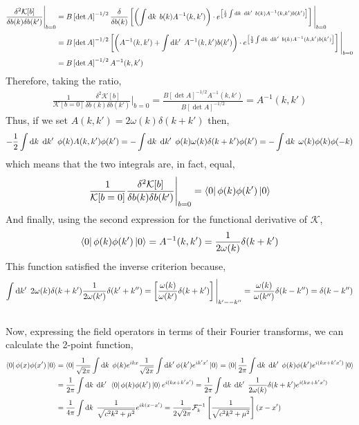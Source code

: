 \documentclass[12pt]{extarticle}
\begin{document}
\begin{align*} \frac{\delta^2 \mathcal{K}[b]}{\delta b(k) \delta b(k')} \Bigg|_{b = 0} & = B \left[ \det{A} \right]^{-1/2} \frac{\delta}{\delta b(k)} \left[ \left( \int \mathrm{d}k \: \: b(k) A^{-1}(k, k') \right) \cdot  e^{\left[\frac{1}{2} \int \mathrm{d}k \: \: \mathrm{d}k' \: \: b(k) A^{-1}(k, k') b(k') \right]} \right] \Bigg|_{b = 0}
\\
& = B \left[ \det{A} \right]^{-1/2}  \left[ \left(  A^{-1}(k, k')  + \int \mathrm{d}k' \: \: A^{-1}(k, k') b(k') \right) \cdot e^{\left[\frac{1}{2} \int \mathrm{d}k \: \: \mathrm{d}k' \: \: b(k) A^{-1}(k, k') b(k') \right]} \right] \Bigg|_{b = 0}
\\
& = B \left[ \det{A} \right]^{-1/2} A^{-1}(k, k')
\end{align*}
Therefore, taking the ratio,
\begin{align*}
\frac{1}{\mathcal{K}[b = 0]} \frac{\delta^2 \mathcal{K}[b]}{\delta b(k) \delta b(k')} \Bigg|_{b = 0} = \frac{B \left[ \det{A} \right]^{-1/2} A^{-1}(k, k')}{B \left[ \det{A} \right]^{-1/2} } = A^{-1}(k, k')
\end{align*}
Thus, if we set $A(k, k') = 2 \omega(k) \delta(k + k')$ then,
\[- \frac{1}{2} \int \mathrm{d}k \: \: \mathrm{d}k' \: \: \phi(k) A(k,k') \phi(k') = - \int \mathrm{d}k \: \: \mathrm{d}k' \: \: \phi(k) \omega(k) \delta(k + k') \phi(k') = - \int \mathrm{d}k \: \: \omega(k) \phi(k) \phi(-k) \]
which means that the two integrals are, in fact, equal,
\begin{align*}
\frac{1}{\mathcal{K}[b = 0]} \frac{\delta^2 \mathcal{K}[b]}{\delta b(k) \delta b(k')} \Bigg|_{b = 0} = \left< 0 \right| \phi(k) \phi(k') \left| 0 \right>
\end{align*}
And finally, using the second expression for the functional derivative of $\mathcal{K}$,
\[\left< 0 \right| \phi(k) \phi(k') \left| 0 \right> = A^{-1}(k, k') = \frac{1}{2 \omega(k)} \delta(k + k') \]
This function satisfied the inverse criterion because,
\[ \int \mathrm{d}k' \: \:2 \omega(k) \delta(k + k') \frac{1}{2 \omega(k')} \delta(k' + k'') =   \left[ \frac{\omega(k)}{\omega(k')} \delta(k + k') \right] \Bigg|_{k' = - k''}  = \frac{\omega(k)}{\omega(k'')} \delta(k - k'') = \delta(k - k'') \] 
\bigskip \\
Now, expressing the field operators in terms of their Fourier transforms, we can calculate the 2-point function,
\begin{align*}
\left< 0 \right| \phi(x) \phi(x') \left| 0 \right> & = \left< 0 \right| \frac{1}{\sqrt{2 \pi}} \int \mathrm{d}k \: \: \phi(k) e^{i k x} \frac{1}{\sqrt{2 \pi}} \int \mathrm{d}k' \: \phi(k') e^{i k' x'} \left| 0 \right> = \left< 0 \right| \frac{1}{2\pi} \int \mathrm{d}k \: \: \mathrm{d}k' \: \: \phi(k) \phi(k') e^{i (k x + k' x')} \left| 0 \right> 
\\
& = \frac{1}{2 \pi} \int \mathrm{d}k \: \: \mathrm{d}k' \: \: \left< 0 \right|  \phi(k) \phi(k') \left| 0 \right>  e^{i (k x + k' x')} = \frac{1}{2 \pi} \int \mathrm{d}k \: \: \mathrm{d}k' \: \: \frac{1}{2 \omega(k)} \delta(k + k') e^{i (k x + k' x')} 
\\
& = \frac{1}{4 \pi} \int \mathrm{d}k \: \: \frac{1}{\sqrt{c^2 k ^2 + \mu^2} } e^{i k (x - x') } = \frac{1}{2 \sqrt{2 \pi}} \mathcal{F}_k^{-1} \left[ \frac{1}{\sqrt{c^2 k^2 + \mu^2}} \right](x - x')
\end{align*}
\end{document}
